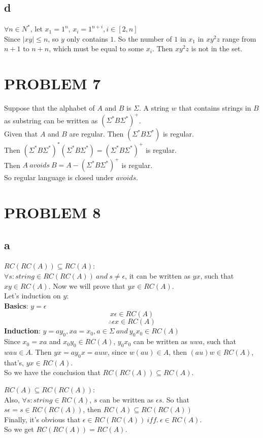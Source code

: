 \documentclass{ctexart}
\begin{document}
\subsection{d}
$\forall n \in N^* $, let $x_1=1^n$, $x_i=1^{n+i}, i\in [2,n]$\\
Since $|xy|\leq n$, so $y$ only contains $1$. So the number of $1$ in $x_1$ in $xy^2z$
range from $n+1$ to $n+n$, which must be equal to some $x_i$. Then $xy^2z$ is not
in the set.

\section{PROBLEM 7}
Suppose that the alphabet of $A$ and $B$ is $\Sigma$. A string $w$ that contains
strings in $B$ as substring can be written as $(\Sigma^*B\Sigma^*)^+$.\\
Given that $A$ and $B$ are regular. Then $(\Sigma^*B\Sigma^*)$ is regular.\\
Then $(\Sigma^*B\Sigma^*)^*(\Sigma^*B\Sigma^*)=(\Sigma^*B\Sigma^*)^+ $ is regular.\\
Then $A\ avoids\ B = A - (\Sigma^*B\Sigma^*)^+$ is regular.\\
So regular language is closed under $avoids$.

\section{PROBLEM 8}
\subsection{a}
\textbf{$RC(RC(A)) \subseteq RC(A)$}:\\
$\forall s:string \in RC(RC(A))\ and \ s\ne\epsilon$, it can be written as $yx$, such
that $xy\in RC(A)$. Now we will prove that $yx\in RC(A)$.\\
Let's induction on $y$:\\
\textbf{Basics}: $y=\epsilon$
\[x\epsilon\in RC(A) \]
\[\therefore \epsilon x \in RC(A)\]
\textbf{Induction}: $y=ay_0,xa=x_0,a\in \Sigma\ and\ y_0x_0\in RC(A) $\\
Since $x_0=xa$ and $x_0y_0\in RC(A)$, $y_0x_0$ can be written  as $uwa$, such that
$wau \in A$.
Then $yx=ay_0x=auw$, since $w(au)\in A$, then $(au)w\in RC(A)$, that's, $yx \in RC(A)$. \\
So we have the conclusion that $RC(RC(A)) \subseteq RC(A)$.

\textbf{$RC(A) \subseteq RC(RC(A))$}:\\
Also, $\forall s:string \in RC(A)$, $s$ can be written as $\epsilon s$.
So that $s\epsilon = s \in RC(RC(A))$, then $RC(A) \subseteq RC(RC(A))$\\
Finally, it's obvious that $\epsilon \in RC(RC(A))\ iff.\ \epsilon \in RC(A)$.\\
So we get $RC(RC(A)) = RC(A)$.
\end{document}
